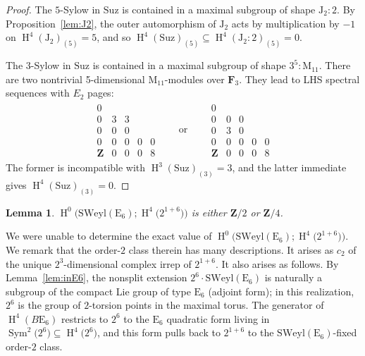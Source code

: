 \documentclass[pdftex]{sigma}
\numberwithin{equation}{section}
\newtheorem{Lemma}[Theorem]{Lemma}
\newcommand\bF{\mathbf F}
\newcommand\bZ{\mathbf Z}
\newcommand\rE{\mathrm E}
\newcommand\rJ{\mathrm J}
\newcommand\rM{\mathrm M}
\DeclareMathOperator\homology{H}
\renewcommand\H{\homology}
\newcommand\<\langle
\renewcommand\>\rangle
\newcommand\Suz{\mathrm{Suz}}
\DeclareMathOperator\Sym{Sym}
\newcommand\SWeyl{\mathrm{SWeyl}}
\begin{document}
\begin{proof}The $5$-Sylow in $\Suz$ is contained in a maximal subgroup of shape $\rJ_2\!:\!2$. By Proposition~\ref{lem:J2}, the outer automorphism of $\rJ_2$ acts by multiplication by $-1$ on $\H^4(\rJ_2)_{(5)} =5$, and so $\H^4(\Suz)_{(5)} \subseteq \H^4(\rJ_2\!:\!2)_{(5)} = 0$.

The $3$-Sylow in $\Suz$ is contained in a maximal subgroup of shape $3^{5}\!:\!\rM_{11}$. There are two nontrivial 5-dimensional $\rM_{11}$-modules over $\bF_3$. They lead to LHS spectral sequences with $E_2$ pages:
 \begin{gather*}
 \begin{array}{ccccc}
 0 \\
 0 & 3 & 3 \\
 0 & 0 & 0 \\
 0 & 0 & 0 & 0 & 0 \\
 \bZ & 0 & 0 & 0 & 8
 \end{array}
 \qquad \text{or} \qquad
 \begin{array}{ccccc}
 0 \\
 0 & 0 & 0 \\
 0 & 3 & 0 \\
 0 & 0 & 0 & 0 & 0 \\
 \bZ & 0 & 0 & 0 & 8
 \end{array}
 \end{gather*}
The former is incompatible with $\H^3(\Suz)_{(3)} = 3$, and the latter immediate gives $\H^4(\Suz)_{(3)} \allowbreak = 0$.
\end{proof}

\begin{Lemma}\label{lem:2or4} $\H^0\big(\SWeyl (\rE_6); \H^4\big(2^{1+6}\big)\big)$ is either $\bZ/2$ or $\bZ/4$.
\end{Lemma}

We were unable to determine the exact value of $\H^0\big(\SWeyl (\rE_6); \H^4\big(2^{1+6}\big)\big)$. We remark that the order-$2$ class therein has many descriptions. It arises as $c_2$ of the unique $2^3$-dimensional complex irrep of $2^{1+6}$. It also arises as follows. By Lemma~\ref{lem:inE6}, the nonsplit extension $2^6\cdot\SWeyl (\rE_6)$ is naturally a subgroup of the compact Lie group of type $\rE_6$ (adjoint form); in this realization, $2^6$ is the group of $2$-torsion points in the maximal torus. The generator of $\H^4(B\rE_6)$ restricts to $2^6$ to the $\rE_6$ quadratic form living in $\Sym^2\big(2^6\big) \subseteq \H^4\big(2^6\big)$, and this form pulls back to $2^{1+6}$ to the $\SWeyl (\rE_6)$-fixed order-$2$ class.
\end{document}
